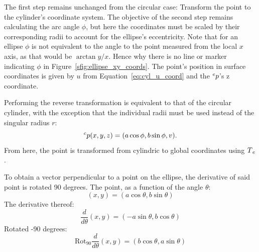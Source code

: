 The first step remains unchanged from the circular case: Transform the point to the cylinder's coordinate system.
The objective of the second step remains calculating the arc angle $\phi$, but here the coordinates must be scaled by their corresponding radii to account for the ellipse's eccentricity.
Note that for an ellipse $\phi$ is not equivalent to the angle to the point measured from the local $x$ axis, as that would be $\arctan y/x$.
Hence why there is no line or marker indicating $\phi$ in Figure~\ref{sfig:ellipse_xy_coords}.
The point's position in surface coordinates is given by $u$ from Equation~\eqref{eq:cyl_u_coord} and the $\prescript{e}{}p$'s z coordinate.

Performing the reverse transformation is equivalent to that of the circular cylinder, with the exception that the individual radii must be used instead of the singular radius $r$:
\begin{equation*}
	\prescript{c}{}p(x,y,z) = (a \cos \phi, b \sin \phi, v).
\end{equation*}
From here, the point is transformed from cylindric to global coordinates using $\prescript{}{}T_e$.

\iffalse
To obtain a vector perpendicular to a point on the ellipse, the derivative of said point is rotated 90 degrees.
The point, as a function of the angle $\theta$:
\begin{equation}
	(x,y) = (a\cos\theta, b\sin\theta)
\end{equation}
The derivative thereof:
\begin{equation}
	\frac{d}{d\theta}(x,y) = (-a\sin\theta, b\cos\theta)
\end{equation}
Rotated -90 degrees:
\begin{equation}
	\text{Rot}_{90}\frac{d}{d\theta}(x,y) = (b\cos\theta, a\sin\theta)
\end{equation}

